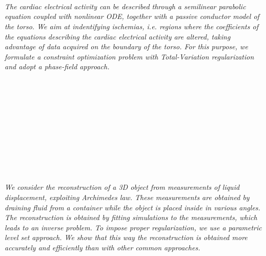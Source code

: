 \begin{multicols}{2}
\\ 
      \\
      \\\\
      \\
      \\\\
\\
    \textit{The cardiac electrical activity can be described through a semilinear parabolic equation coupled with nonlinear ODE, together with a passive conductor model of the torso.
We aim at indentifying ischemias, i.e. regions where the coefficients of the equations describing the cardiac electrical activity are altered, taking advantage of data acquired on the boundary of the torso. 
For this purpose, we formulate a constraint optimization problem with Total-Variation regularization and adopt a phase-field approach.}\\
\\ 
      \\
      \\\\
      \\
      \\\\
      \\
      \\\\
\\
    \textit{We consider the reconstruction of a 3D object from measurements of liquid displacement, exploiting Archimedes law. These measurements are obtained by draining fluid from a container while the object is placed inside in various angles. The reconstruction is obtained by fitting simulations to the measurements, which leads to an inverse problem. To impose proper regularization, we use a parametric level set approach. We show that this way the reconstruction is obtained more accurately and efficiently than with other common approaches. }\\
\\ 
      \\
      \\\\
      \\
      \\\\

\end{multicols}
